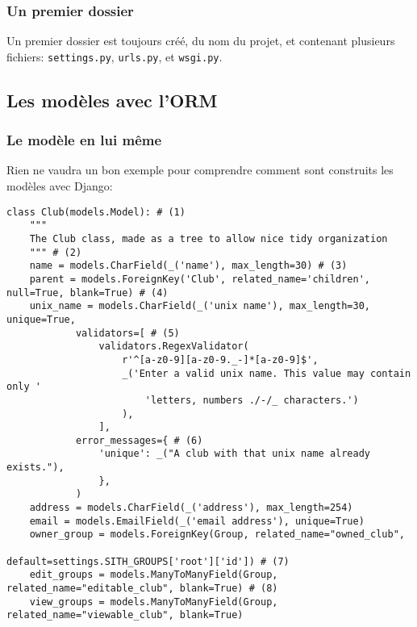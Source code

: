 \documentclass[a4paper]{report}
\begin{document}
\subsubsection{Un premier dossier}
\label{ssub:Un premier dossier}
\par Un premier dossier est toujours créé, du nom du projet, et contenant plusieurs fichiers: \verb#settings.py#,
\verb#urls.py#, et \verb#wsgi.py#.


\subsection{Les modèles avec l'ORM}
\label{sub:les_modèles_avec_l_orm}

\subsubsection{Le modèle en lui même}
\label{ssub:Le modèle en lui même}
\par Rien ne vaudra un bon exemple pour comprendre comment sont construits les modèles avec Django:
\begin{addmargin}[-7em]{0em}
\begin{lstlisting}
class Club(models.Model): # (1)
    """
    The Club class, made as a tree to allow nice tidy organization
    """ # (2)
    name = models.CharField(_('name'), max_length=30) # (3)
    parent = models.ForeignKey('Club', related_name='children', null=True, blank=True) # (4)
    unix_name = models.CharField(_('unix name'), max_length=30, unique=True,
            validators=[ # (5)
                validators.RegexValidator(
                    r'^[a-z0-9][a-z0-9._-]*[a-z0-9]$',
                    _('Enter a valid unix name. This value may contain only '
                        'letters, numbers ./-/_ characters.')
                    ),
                ],
            error_messages={ # (6)
                'unique': _("A club with that unix name already exists."),
                },
            )
    address = models.CharField(_('address'), max_length=254)
    email = models.EmailField(_('email address'), unique=True)
    owner_group = models.ForeignKey(Group, related_name="owned_club",
                                    default=settings.SITH_GROUPS['root']['id']) # (7)
    edit_groups = models.ManyToManyField(Group, related_name="editable_club", blank=True) # (8)
    view_groups = models.ManyToManyField(Group, related_name="viewable_club", blank=True)
\end{lstlisting}
\end{addmargin}
\end{document}
